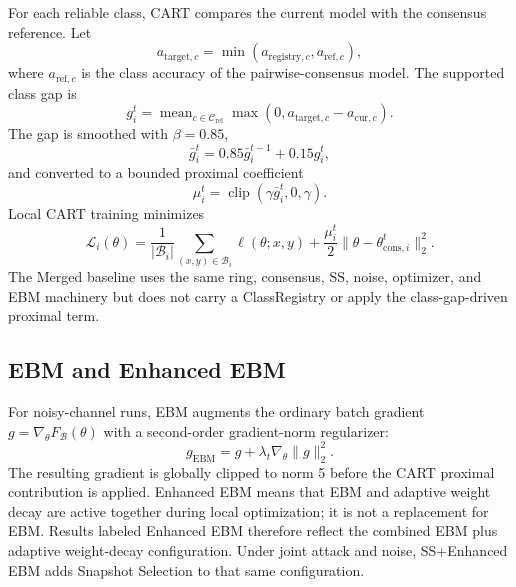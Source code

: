 \documentclass[conference]{IEEEtran}
\begin{document}
For each reliable class, CART compares the current model with the consensus reference. Let
\begin{equation}
a_{\mathrm{target},c}=\min(a_{\mathrm{registry},c},a_{\mathrm{ref},c}),
\end{equation}
where $a_{\mathrm{ref},c}$ is the class accuracy of the pairwise-consensus model. The supported class gap is
\begin{equation}
g_i^t=\operatorname{mean}_{c\in\mathcal{C}_{\mathrm{rel}}}
\max(0,a_{\mathrm{target},c}-a_{\mathrm{cur},c}).
\end{equation}
The gap is smoothed with $\beta=0.85$,
\begin{equation}
\bar g_i^t=0.85\bar g_i^{t-1}+0.15g_i^t,
\end{equation}
and converted to a bounded proximal coefficient
\begin{equation}
\mu_i^t=\operatorname{clip}(\gamma\bar g_i^t,0,\gamma).
\label{eq:mu}
\end{equation}
Local CART training minimizes
\begin{equation}
\mathcal{L}_i(\theta)=\frac{1}{|\mathcal{B}_i|}\sum_{(x,y)\in\mathcal{B}_i}\ell(\theta;x,y)
+\frac{\mu_i^t}{2}\|\theta-\theta_{\mathrm{cons},i}^t\|_2^2.
\label{eq:cartloss}
\end{equation}
The Merged baseline uses the same ring, consensus, SS, noise, optimizer, and EBM machinery but does not carry a ClassRegistry or apply the class-gap-driven proximal term.

\subsection{EBM and Enhanced EBM}
For noisy-channel runs, EBM augments the ordinary batch gradient $g=\nabla_\theta F_{\mathcal{B}}(\theta)$ with a second-order gradient-norm regularizer:
\begin{equation}
g_{\mathrm{EBM}}=g+\lambda_t\nabla_\theta\|g\|_2^2.
\label{eq:ebm}
\end{equation}
The resulting gradient is globally clipped to norm 5 before the CART proximal contribution is applied. Enhanced EBM means that EBM and adaptive weight decay are active together during local optimization; it is not a replacement for EBM. Results labeled Enhanced EBM therefore reflect the combined EBM plus adaptive weight-decay configuration. Under joint attack and noise, SS+Enhanced EBM adds Snapshot Selection to that same configuration.
\end{document}
